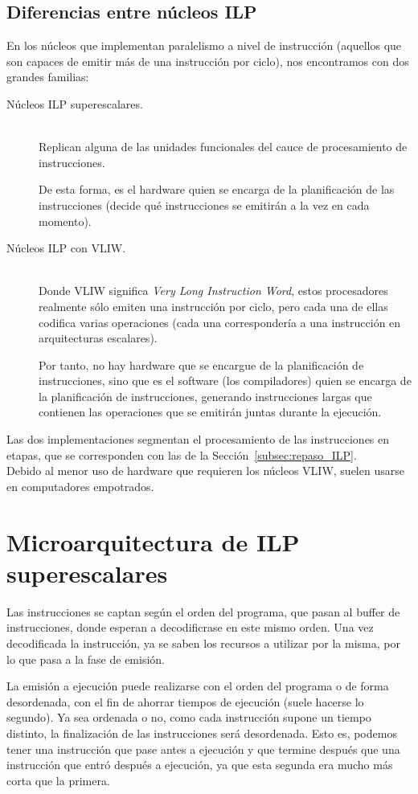 \subsection{Diferencias entre núcleos ILP}
En los núcleos que implementan paralelismo a nivel de instrucción (aquellos que son capaces de emitir más de una instrucción por ciclo), nos encontramos con dos grandes familias:
\begin{description}
    \item [Núcleos ILP superescalares.]~\\
        Replican alguna de las unidades funcionales del cauce de procesamiento de instrucciones. 

        De esta forma, es el hardware quien se encarga de la planificación de las instrucciones (decide qué instrucciones se emitirán a la vez en cada momento).
    \item [Núcleos ILP con VLIW.]~\\
        Donde VLIW significa \emph{Very Long Instruction Word}, estos procesadores realmente sólo emiten una instrucción por ciclo, pero cada una de ellas codifica varias operaciones (cada una correspondería a una instrucción en arquitecturas escalares). 

        Por tanto, no hay hardware que se encargue de la planificación de instrucciones, sino que es el software (los compiladores) quien se encarga de la planificación de instrucciones, generando instrucciones largas que contienen las operaciones que se emitirán juntas durante la ejecución.
\end{description}
Las dos implementaciones segmentan el procesamiento de las instrucciones en etapas, que se corresponden con las de la Sección~\ref{subsec:repaso_ILP}.\\

Debido al menor uso de hardware que requieren los núcleos VLIW, suelen usarse en computadores empotrados.\\

\section{Microarquitectura de ILP superescalares}
Las instrucciones se captan según el orden del programa, que pasan al buffer de instrucciones, donde esperan a decodificrase en este mismo orden. Una vez decodificada la instrucción, ya se saben los recursos a utilizar por la misma, por lo que pasa a la fase de emisión.

La emisión a ejecución puede realizarse con el orden del programa o de forma desordenada, con el fin de ahorrar tiempos de ejecución (suele hacerse lo segundo). Ya sea ordenada o no, como cada instrucción supone un tiempo distinto, la finalización de las instrucciones será desordenada. Esto es, podemos tener una instrucción que pase antes a ejecución y que termine después que una instrucción que entró después a ejecución, ya que esta segunda era mucho más corta que la primera.\\

